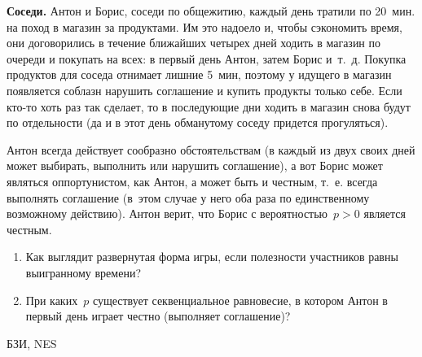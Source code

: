 \begin{problem}

{\bf Соседи.} Антон и Борис, соседи по общежитию,
каждый день тратили по 20~мин. на поход в магазин за
продуктами. Им это надоело и, чтобы сэкономить время, они
договорились в течение ближайших четырех дней ходить в
магазин по очереди и покупать на всех: в первый день Антон,
затем Борис и~т.~д. Покупка продуктов для соседа отнимает
лишние 5~мин, поэтому у идущего в магазин появляется
соблазн нарушить соглашение и купить продукты только себе.
Если кто-то хоть раз так сделает, то в последующие дни
ходить в магазин снова будут по отдельности (да и в этот
день обманутому соседу придется прогуляться).

Антон всегда действует сообразно обстоятельствам (в каждый
из двух своих дней может выбирать, выполнить или нарушить
соглашение), а вот Борис может являться оппортунистом, как
Антон, а может быть и честным, т.~е. всегда выполнять
соглашение (в~этом случае у него оба раза по единственному
возможному действию). Антон верит, что Борис с
вероятностью~$p>0$ является честным.

\begin{enumerate}
  \item Как выглядит развернутая форма игры, если полезности
  участников равны выигранному времени?
  \item При каких~$p$ существует секвенциальное  равновесие,
  в котором Антон в первый день играет честно (выполняет
  соглашение)?
\end{enumerate}



\begin{source}
БЗИ, NES
\end{source}


\begin{sol}

\end{sol}
\end{problem}




